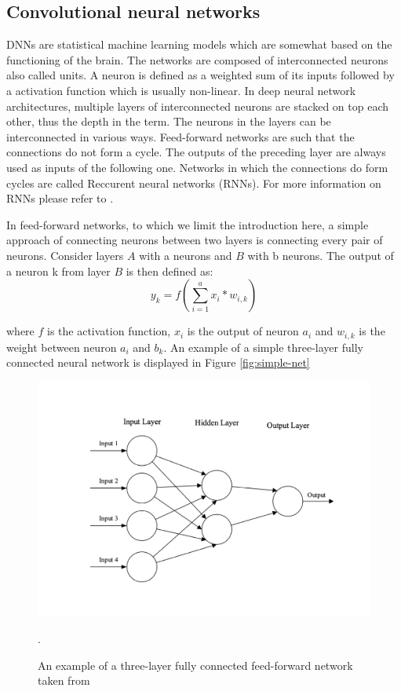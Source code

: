 \subsection{Convolutional neural networks}
DNNs are statistical machine learning models which are somewhat based on the functioning of the brain.
The networks are composed of interconnected neurons also called units.
A neuron is defined as a weighted sum of its inputs followed by a activation function which is usually non-linear.
In deep neural network architectures, multiple layers of interconnected neurons are stacked on top each other, thus the depth in the term.
The neurons in the layers can be interconnected in various ways.
Feed-forward networks are such that the connections do not form a cycle.
The outputs of the preceding layer are always used as inputs of the following one. 
Networks in which the connections do form cycles are called Reccurent neural networks (RNNs). 
For more information on RNNs please refer to \cite{reccurent-neural-networks}. 

In feed-forward networks, to which we limit the introduction here, a simple approach of connecting neurons between two layers is connecting every pair of neurons. 
Consider layers $A$ with a neurons and $B$ with b neurons.
The output of a neuron k from layer $B$ is then defined as:
\begin{equation}
    y_k=f(\sum_{i=1}^{a}x_i*w_{i,k})
\end{equation}

where $f$ is the activation function, $x_i$ is the output of neuron $a_i$ and $w_{i, k}$ is the weight between neuron $a_i$ and $b_k$. An example of a simple three-layer fully connected neural network is displayed in Figure \ref{fig:simple-net}
\begin{figure}[!htpb]
\centering
   \includegraphics[width=0.8\linewidth]{img/ch2/simple-net}
   \caption[Feed-forward network example]{An example of a three-layer fully connected feed-forward network taken from \cite{conv-intro}}.
\end{figure}\label{fig:simple-net}

